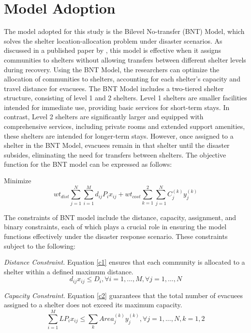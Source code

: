 \section{Model Adoption}
	The model adopted for this study is the Bilevel No-transfer (BNT) Model, which solves the shelter location-allocation problem under disaster scenarios. As discussed in a published paper by \textcite{LeahUP}, this model is effective when it assigns communities to shelters without allowing transfers between different shelter levels during recovery. Using the BNT Model, the researchers can optimize the allocation of communities to shelters, accounting for each shelter’s capacity and travel distance for evacuees.
	The BNT Model includes a two-tiered shelter structure, consisting of level 1 and 2 shelters. Level 1 shelters are smaller facilities intended for immediate use, providing basic services for short-term stays. In contrast, Level 2 shelters are significantly larger and equipped with comprehensive services, including private rooms and extended support amenities, these shelters are intended for longer-term stays. However, once assigned to a shelter in the BNT Model, evacuees remain in that shelter until the disaster subsides, eliminating the need for transfers between shelters.
	The objective function for the BNT model can be expressed as follows:
	
	Minimize 
	\begin{equation}
		wt_{dist}\sum_{j=1}^{N}\sum_{i=1}^{M}d_{ij}P_{i}x_{ij}+wt_{cost}\sum_{k=1}^{2}\sum_{j=1}^{N}C_{j}^{(k)}y_{j}^{(k)} 
	\end{equation}
	
	The constraints of BNT model include the distance, capacity, assignment, and binary constraints, each of which plays a crucial role in ensuring the model functions effectively under the disaster response scenario. These constraints subject to the following: 
	
	\textit{Distance Constraint.} Equation \ref{c1} ensures that each community is allocated to a shelter within a defined maximum distance. 
	\begin{equation} 	
		\label{c1}
		d_{ij}x_{ij} \le D_{i}, \forall i = 1,..., M,  \forall j = 1,..., N 
	\end{equation}
	
	\textit{Capacity Constraint.} Equation \ref{c2} guarantees that the total number of evacuees assigned to a shelter does not exceed its maximum capacity. 
	\begin{equation} 
		\label{c2}
		\sum_{i=1}^{M}LP_{i}x_{ij} \le \sum_{k} Area_{j}^{(k)} y_{j}^{(k)}, \forall j = 1,..., N , k=1,2
	\end{equation}
	

